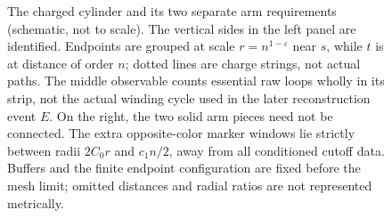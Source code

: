 \begin{figure}[tbp]
\caption{The charged cylinder and its two separate arm requirements (schematic, not to scale). The vertical sides in the left panel are identified. Endpoints are grouped at scale $r=n^{1-\varepsilon}$ near $s$, while $t$ is at distance of order $n$; dotted lines are charge strings, not actual paths. The middle observable counts essential raw loops wholly in its strip, not the actual winding cycle used in the later reconstruction event $E$. On the right, the two solid arm pieces need not be connected. The extra opposite-color marker windows lie strictly between radii $2C_0r$ and $c_1n/2$, away from all conditioned cutoff data. Buffers and the finite endpoint configuration are fixed before the mesh limit; omitted distances and radial ratios are not represented metrically.}
\label{fig:charged-cylinder}
\end{figure}
